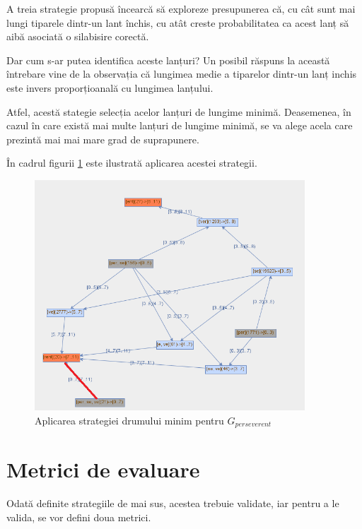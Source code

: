 A treia strategie propusă încearcă să exploreze presupunerea că, cu cât sunt mai lungi tiparele dintr-un lant închis, cu atât creste probabilitatea ca acest lanț să aibă asociată o silabisire corectă.

Dar cum s-ar putea identifica aceste lanțuri? Un posibil răspuns la această întrebare vine de la observația că lungimea medie a tiparelor dintr-un lanț inchis este invers proporțioanală cu lungimea lanțului. 

Atfel, acestă stategie selecția acelor lanțuri de lungime minimă. Deasemenea, în cazul în care există mai multe lanțuri de lungime minimă, se va alege acela care prezintă mai mai mare grad de suprapunere. 

\begin{ex}
În cadrul figurii \ref{fig:rosil-shortest} este ilustrată aplicarea acestei strategii. 
\end{ex}

\begin{figure}[h!]
    \centering
    \includegraphics[width=0.9\textwidth]{figures/rosil-shortest.png}
    \caption{Aplicarea strategiei drumului minim pentru $G_{perseverent}$}
    \label{fig:rosil-shortest}
\end{figure}

\section{Metrici de evaluare}

Odată definite strategiile de mai sus, acestea trebuie validate, iar pentru a le valida, se vor defini doua metrici.

